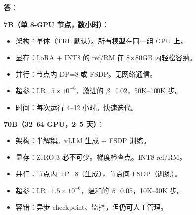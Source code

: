 \begin{questionbox}
\textbf{答}：

\textbf{7B（单 8-GPU 节点，数小时）}：

\begin{itemize}
  \item 架构：单体（TRL 默认）。所有模型在同一组 GPU 上。
  \item 显存：LoRA + INT8 的 ref/RM 在 8$\times$80GB 内轻松容纳。
  \item 并行：节点内 DP=8 或 FSDP。无网络通信。
  \item 超参：LR=$5\times10^{-6}$，激进的 $\beta$=0.02，50K--100K 步。
  \item 时间：每次运行 4--12 小时。快速迭代。
\end{itemize}

\textbf{70B（32--64 GPU，2--5 天）}：

\begin{itemize}
  \item 架构：半解耦。vLLM 生成 + FSDP 训练。
  \item 显存：ZeRO-3 必不可少。梯度检查点。INT8 ref/RM。
  \item 并行：节点内 TP=8（生成），节点间 FSDP（训练）。
  \item 超参：LR=$1.5\times10^{-6}$，温和的 $\beta$=0.05，10K--30K 步。
  \item 容错：异步 checkpoint、监控，但仍可人工管理。
\end{itemize}


\end{questionbox}
